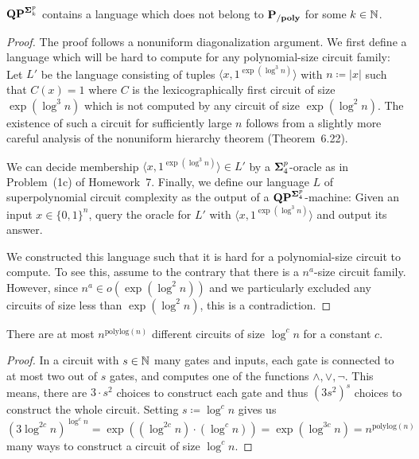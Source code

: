 \documentclass[12pt]{article}
\theoremstyle{definition}
\begin{document}
\begin{lemma}
  \label{lem:qp-super-circ}
  $\mathbf{QP}^{\mathbf{\Sigma}^p_k}$ contains a language which does not belong
  to $\mathbf{P_{/poly}}$ for some $k \in {\mathbb{N}}$.
\end{lemma}

\begin{proof}
  The proof follows a nonuniform diagonalization argument. We first define
  a language which will be hard to compute for any polynomial-size circuit
  family:
  Let $L'$ be the language consisting of tuples
  $\langle x, 1^{\exp(\log^3 n)} \rangle$
  with $n \coloneqq |x|$
  such that $C(x) = 1$ where $C$ is the
  lexicographically first circuit of size $\exp(\log^3 n)$ which is not
  computed by any circuit of size $\exp(\log^2 n)$.
  The existence of such a circuit for sufficiently large $n$ follows from a
  slightly more careful analysis of the nonuniform hierarchy theorem
  (Theorem~6.22).

  We can decide membership $\langle x, 1^{\exp(\log^3 n)} \rangle \in L'$
  by a $\mathbf{\Sigma}^p_4$-oracle as in Problem~(1c) of Homework~7.
  Finally, we define our language $L$ of superpolynomial circuit complexity
  as the output of a $\mathbf{QP}^{\mathbf{\Sigma}^p_4}$-machine: Given an input
  $x \in \{0,1\}^n$, query the oracle for $L'$ with
  $\langle x, 1^{\exp(\log^3 n)} \rangle$ and output its answer.

  We constructed this language such that it is hard for a polynomial-size
  circuit to compute. To see this, assume to the contrary that there is
  a $n^a$-size circuit family.
  However, since $n^a \in o(\exp(\log^2 n))$ and we particularly excluded any
  circuits of size less than $\exp(\log^2 n)$, this is a contradiction.
\end{proof}

\begin{lemma}
  \label{lem:num-of-circs}
  There are at most $n^{\mathrm{polylog}(n)}$ different circuits of size
  $\log^c n$ for a constant $c$.
\end{lemma}

\begin{proof}
  In a circuit with $s \in {\mathbb{N}}$ many gates and inputs, each gate is connected to
  at most two out of $s$ gates, and computes one of the functions
  $\land, \lor, \neg$.
  This means, there are $3 \cdot s^2$ choices to construct each gate and thus
  $(3 s^2)^s$ choices to construct the whole circuit.
  Setting $s \coloneqq \log^c n$ gives us
  \[
    (3 \log^{2c} n)^{\log^c n}
    =
    \exp((\log^{2c} n) \cdot (\log^c n))
    =
    \exp(\log^{3c} n)
    =
    n^{\mathrm{polylog}(n)}
  \]
  many ways to construct a circuit of size $\log^c n$.
\end{proof}
\end{document}
